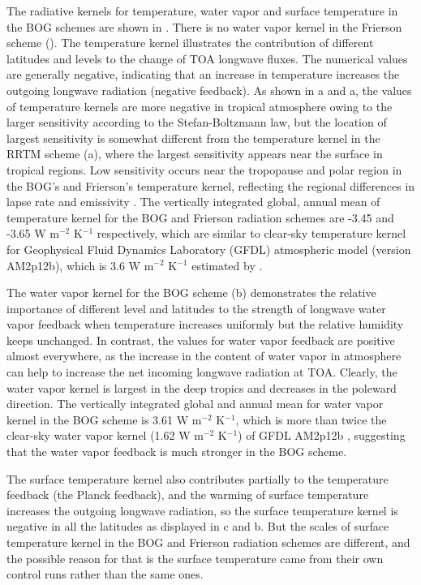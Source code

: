 The radiative kernels for temperature, water vapor and surface temperature in the BOG schemes are shown in . There is no water vapor kernel in the Frierson scheme (). The temperature kernel illustrates the contribution of different latitudes and levels to the change of TOA longwave fluxes. The numerical values are generally negative, indicating that an increase in temperature increases the outgoing longwave radiation (negative feedback). As shown in a and a, the values of temperature kernels are more negative in tropical atmosphere owing to the larger sensitivity according to the Stefan-Boltzmann law, but the location of largest sensitivity is somewhat different from the temperature kernel in the RRTM scheme (a), where the largest sensitivity appears near the surface in tropical regions. Low sensitivity occurs near the tropopause and polar region in the BOG's and Frierson's temperature kernel, reflecting the regional differences in lapse rate and emissivity \citep{Soden2008}. The vertically integrated global, annual mean of temperature kernel for the BOG and Frierson radiation schemes are -3.45 and -3.65 W m$^{-2}$ K$^{-1}$ respectively, which are similar to clear-sky temperature kernel for Geophysical Fluid Dynamics Laboratory (GFDL) atmospheric model (version AM2p12b), which is 3.6 W m$^{-2}$ K$^{-1}$ estimated by \cite{Soden2008}.

The water vapor kernel for the BOG scheme (b) demonstrates the relative importance of different level and latitudes to the strength of longwave water vapor feedback when temperature increases uniformly but the relative humidity keeps unchanged. In contrast, the values for water vapor feedback are positive almost everywhere, as the increase in the content of water vapor in atmosphere can help to increase the net incoming longwave radiation at TOA. Clearly, the water vapor kernel is largest in the deep tropics and decreases in the poleward direction. The vertically integrated global and annual mean for water vapor kernel in the BOG scheme is 3.61 W m$^{-2}$ K$^{-1}$, which is more than twice the clear-sky water vapor kernel (1.62 W m$^{-2}$ K$^{-1}$) of GFDL AM2p12b \citep{Soden2008}, suggesting that the water vapor feedback is much stronger in the BOG scheme.

The surface temperature kernel also contributes partially to the temperature feedback (the Planck feedback), and the warming of surface temperature increases the outgoing longwave radiation, so the surface temperature kernel is negative in all the latitudes as displayed in c and b. But the scales of surface temperature kernel in the BOG and Frierson radiation schemes are different, and the possible reason for that is the surface temperature came from their own control runs rather than the same ones.

